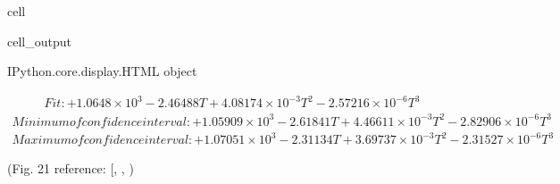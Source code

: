 \documentclass[letterpaper,10pt,english]{jupyterBook}
\begin{document}
\begin{sphinxuseclass}{cell}
\begin{sphinxVerbatimOutput}
\begin{sphinxuseclass}{cell_output}
				\begin{sphinxVerbatim}[commandchars=\\\{\}]
					\PYGZlt{}IPython.core.display.HTML object\PYGZgt{}
				\end{sphinxVerbatim}
				
				\sphinxAtStartPar
				\begin{equation*}
					\begin{split}Fit: \boxed{ + 1.0648 \times 10^{3} - 2.46488 T + 4.08174 \times 10^{-3} T^{2} - 2.57216 \times 10^{-6} T^{3}  }\end{split}
				\end{equation*}\begin{equation*}
					\begin{split}Minimum of confidence interval: \boxed{ + 1.05909 \times 10^{3} - 2.61841 T + 4.46611 \times 10^{-3} T^{2} - 2.82906 \times 10^{-6} T^{3}  }\end{split}
				\end{equation*}\begin{equation*}
					\begin{split}Maximum of confidence interval: \boxed{ + 1.07051 \times 10^{3} - 2.31134 T + 3.69737 \times 10^{-3} T^{2} - 2.31527 \times 10^{-6} T^{3}  }\end{split}
				\end{equation*}
				\noindent{}
				
		\end{sphinxuseclass}\end{sphinxVerbatimOutput}
		
	\end{sphinxuseclass}
	\sphinxAtStartPar
	(Fig. 21 reference: {[}, , \sphinxhref{https://drive.google.com/file/d/1CS0SmOoC0Ukjj6AhscMyon7bKQiny88N/view?usp=drive\_link}{Klueh1997}{]})
	
	
\end{document}
